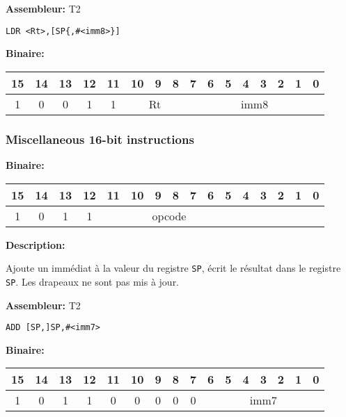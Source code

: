 \textbf{Assembleur:} T2

\begin{lstlisting}
LDR <Rt>,[SP{,#<imm8>}]
\end{lstlisting}

\textbf{Binaire:}\\

\begin{tabular}{| c c c c c c c c c c c c c c c c |}
\hline
15 & 14 & 13 & 12 & \multicolumn{1}{|c}{11} & \multicolumn{1}{|c}{10} & 9 & 8 & \multicolumn{1}{|c}{7} & 6 & 5 & 4 & 3 & 2 & 1 & 0 \\
\hline
1 & 0 & 0 & 1 & \multicolumn{1}{|c}{1} & \multicolumn{3}{|c}{Rt} & \multicolumn{8}{|c|}{imm8} \\
\hline
\end{tabular}



\subsubsection{Miscellaneous 16-bit instructions}
\label{subsubsec:MiscInstr}

\textbf{Binaire:}\\

\begin{tabular}{| c c c c c c c c c c c c c c c c |}
\hline
15 & 14 & 13 & 12 & \multicolumn{1}{|c}{11} & 10 & 9 & 8 & 7 & 6 & 5 & \multicolumn{1}{|c}{4} & 3 & 2 & 1 & 0 \\
\hline
1 & 0 & 1 & 1 & \multicolumn{7}{|c}{opcode} & \multicolumn{5}{|c|}{} \\
\hline
\end{tabular}


\textbf{Description: }

Ajoute un immédiat à la valeur du registre \texttt{SP}, écrit le résultat dans le registre \texttt{SP}.
Les drapeaux ne sont pas mis à jour.

\textbf{Assembleur:} T2

\begin{lstlisting}
ADD [SP,]SP,#<imm7>
\end{lstlisting}

\textbf{Binaire:}\\

\begin{tabular}{| c c c c c c c c c c c c c c c c |}
\hline
15 & 14 & 13 & 12 & \multicolumn{1}{|c}{11} & 10 & 9 & 8 & \multicolumn{1}{|c}{7} & \multicolumn{1}{|c}{6} & 5 & 4 & 3 & 2 & 1 & 0 \\
\hline
1 & 0 & 1 & 1 & \multicolumn{1}{|c}{0} & 0 & 0 & 0 & \multicolumn{1}{|c}{0} & \multicolumn{7}{|c|}{imm7} \\
\hline
\end{tabular}

